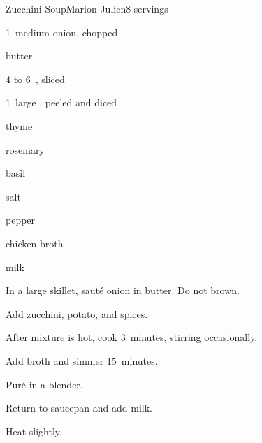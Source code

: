 \begin{recipe}{Zucchini Soup\UNTESTED}{Marion Julien}{8 servings}

\begin{ingredients}
\item 1~medium onion, chopped
\item {} butter
\item 4 to 6~, sliced
\item 1~large , peeled and diced
\item \tp{\quarter} thyme
\item \tp{\quarter} rosemary
\item \tp{\quarter} basil
\item \tp{\quarter} salt
\item pepper
\item {} chicken broth
\item {} milk
\end{ingredients}

\begin{directions}
\item In a large skillet, saut\'e onion in butter. Do not brown.
\item Add zucchini, potato, and spices.
\item After mixture is hot, cook 3~minutes, stirring occasionally.
\item Add broth and simmer 15~minutes.
\item Pur\'e in a blender.
\item Return to saucepan and add milk.
\item Heat slightly.
\end{directions}

\end{recipe}
